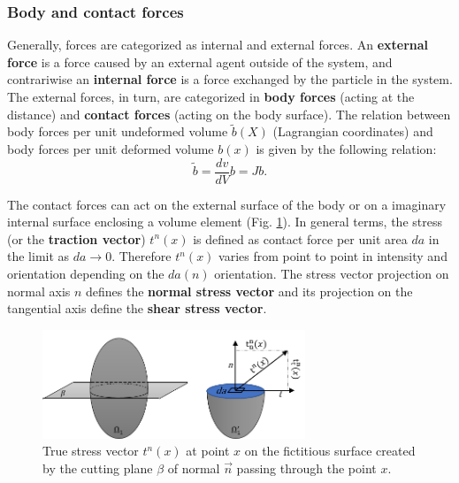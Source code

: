 \subsubsection*{Body and contact forces}\label{bodycontactforces}
Generally, forces are categorized as internal and external forces. An \textbf{external force } is a force caused by an external agent outside of the system, and contrariwise an \textbf{internal force} is a force exchanged by the particle in the system. The external forces, in turn, are categorized in \textbf{body forces} (acting at the distance) and \textbf{contact forces} (acting on the body surface). The relation between body forces per unit undeformed volume $\tilde{b}(X)$ (Lagrangian coordinates) and body forces per unit deformed volume $b(x)$ is given by the following relation:
\begin{equation}
\tilde{b} = \frac{dv}{dV} b = Jb.
\end{equation}

The contact forces can act on the external surface of the body or on a imaginary internal surface enclosing a volume element (Fig. \ref{internalcontactForceDefinition}). 
In general terms, the stress (or the \textbf{traction vector}) $t^n(x)$ is defined as contact force per unit area $da$ in the limit as $da \rightarrow 0$. Therefore $t^n(x)$ varies from point to point in intensity and orientation depending on the $da(n)$ orientation.  The stress vector projection on normal axis $n$ defines the \textbf{normal stress vector} and its projection on the tangential axis define the \textbf{shear stress vector}.


\begin{figure}
\begin{center}
\includegraphics[width=0.7\textwidth,keepaspectratio]{figures/internalcontactForceDefinition.png} 
\caption[]{True stress vector $t^n(x)$ at point $x$ on the fictitious surface created  by the cutting plane $\beta$ of normal  $\overrightarrow n$ passing through the point $x$. }
\label{internalcontactForceDefinition}
\end{center}
\end{figure}

